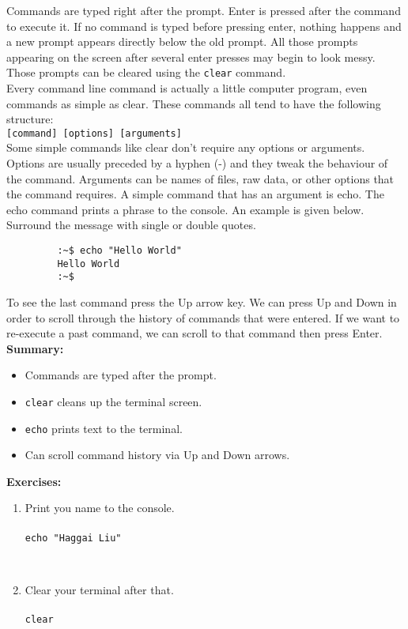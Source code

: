 \documentclass[12pt]{article}
\newcommand{\code}[1]{
\texttt{#1}
}
\begin{document}
		 Commands are typed right after the prompt. Enter is pressed after the command to execute it. If no command is typed before pressing enter, nothing happens and a new prompt appears directly below the old prompt. All those prompts appearing on the screen after several enter presses may begin to look messy. Those prompts can be cleared using the \code{clear} command.\\
		 
		 Every command line command is actually a little computer program, even commands as simple as clear. These commands all tend to have the following structure:\\
		 \code{[command] [options] [arguments]}\\
		 
		 Some simple commands like clear don't require any options or arguments. Options are usually preceded by a hyphen (-) and they tweak the behaviour of the command. Arguments can be names of files, raw data, or other options that the command requires. A simple command that has an argument is echo. The echo command prints a phrase to the console. An example is given below. Surround the message with single or double quotes.
		 
		 \begin{verbatim}
		 :~$ echo "Hello World"
		 Hello World
		 :~$
		 \end{verbatim}
		 
		 To see the last command press the Up arrow key. We can press Up and Down in order to scroll through the history of commands that were entered. If we want to re-execute a past command, we can scroll to that command then press Enter. \\
		 
		 \textbf{Summary:}
		 \begin{itemize}
		 \item Commands are typed after the prompt.
		 \item \code{clear} cleans up the terminal screen.
		 \item \code{echo} prints text to the terminal.
		 \item Can scroll command history via Up and Down arrows.
		 \end{itemize}
		 
		 \textbf{Exercises:}
		 
		 \begin{enumerate}
		 \item Print you name to the console.\\\\
		 \code{echo "Haggai Liu"}
		 \\
		 \item Clear your terminal after that.\\\\
		 \code{clear}\\
		 \end{enumerate}
		 
\end{document}
